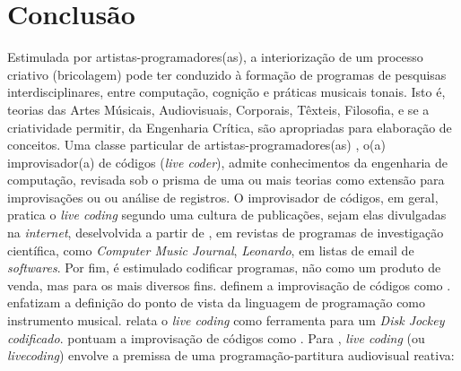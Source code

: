 \chapter*[Conclusão]{Conclusão}\label{conclusao}


Estimulada por artistas-programadores(as), a interiorização de um processo criativo (bricolagem) pode ter conduzido à formação de programas de pesquisas interdisciplinares, entre computação, cognição e práticas musicais tonais. Isto é, teorias das Artes Músicais, Audiovisuais, Corporais, Têxteis, Filosofia, e se a criatividade permitir, da Engenharia Crítica, são apropriadas para elaboração de conceitos. Uma classe particular de artistas-programadores(as) \cite[p.~16]{McLean2011}, o(a) improvisador(a) de códigos (\emph{live coder}), admite conhecimentos da engenharia de computação, revisada sob o prisma de uma ou mais teorias como extensão para improvisações ou ou análise de registros. O improvisador de códigos, em geral, pratica o \emph{live coding} segundo uma cultura de publicações, sejam elas divulgadas na \emph{internet}, deselvolvida a partir de \cite{ward_live_2004}, em revistas de programas de investigação científica, como  \emph{Computer Music Journal}, \emph{Leonardo}, em listas de email de \emph{softwares}. Por fim, é estimulado codificar programas, não como um produto de venda, mas para os mais diversos fins.  definem a improvisação de códigos como .  enfatizam a definição do ponto de vista da linguagem de programação como instrumento musical.  relata o \emph{live coding} como ferramenta para um \emph{Disk Jockey codificado}.   pontuam a improvisação de códigos como . Para , \emph{live coding} (ou \emph{livecoding}) envolve a premissa de uma programação-partitura audiovisual reativa: 

